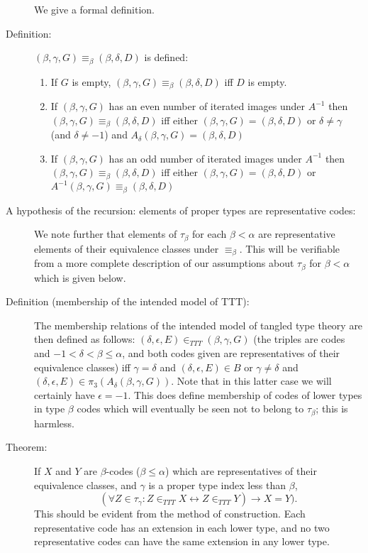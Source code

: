 \documentclass[112pt]{article}
\begin{document}
\begin{description}
We give a formal definition.



\item[Definition:]  $(\beta,\gamma,G) \equiv_\beta (\beta,\delta,D)$ is defined:

\begin{enumerate}

\item If $G$ is empty, $(\beta,\gamma,G) \equiv_\beta (\beta,\delta,D)$ iff $D$ is empty.

\item  If $(\beta,\gamma,G)$ has an even number of iterated images under $A^{-1}$ then $(\beta,\gamma,G) \equiv_\beta (\beta,\delta,D)$ iff
either $(\beta,\gamma,G) = (\beta,\delta,D)$ or $\delta \neq \gamma$ (and $\delta \neq -1$) and $A_\delta(\beta,\gamma,G) = (\beta,\delta,D)$

\item If $(\beta,\gamma,G)$ has an odd number of iterated images under $A^{-1}$ then $(\beta,\gamma,G) \equiv_\beta (\beta,\delta,D)$ iff
either $(\beta,\gamma,G) = (\beta,\delta,D)$ or $A^{-1}(\beta,\gamma,G) \equiv_\beta (\beta,\delta,D)$

\end{enumerate}



\item[A hypothesis of the recursion:  elements of proper types are representative codes:]

We note further that elements of $\tau_\beta$ for each $\beta<\alpha$ are representative elements of their equivalence classes under $\equiv_\beta$.  This will be verifiable from a more complete description of our assumptions about $\tau_\beta$ for $\beta<\alpha$ which is given below.

\item[Definition (membership of the intended model of TTT):]  The membership relations of the intended model of tangled type theory are then defined as follows: $(\delta,\epsilon,E) \in_{TTT} (\beta,\gamma,G)$ (the triples are codes and $-1<\delta<\beta \leq \alpha$, and both codes given are representatives of their equivalence classes) iff $\gamma=\delta$ and
$(\delta,\epsilon,E)  \in B$ or $\gamma\neq \delta$ and $(\delta,\epsilon,E) \in \pi_3(A_{\delta}(\beta,\gamma,G))$.  Note that in this latter case we will certainly have $\epsilon=-1$.  This does define membership of codes of lower types in
type $\beta$ codes which will eventually be seen not to belong to $\tau_\beta$;  this is harmless.

\item[Theorem:]  If $X$ and $Y$ are $\beta$-codes ($\beta \leq \alpha$) which are representatives of their equivalence classes, and $\gamma$ is a proper type index less than $\beta$,
$$(\forall Z \in \tau_\gamma: Z \in_{TTT} X \leftrightarrow Z \in_{TTT} Y) \rightarrow X = Y).$$  This should be evident from the method of construction.   Each representative code has an extension in each lower type, and no two representative codes can have the same extension in any lower type.

\end{description}
\end{document}
